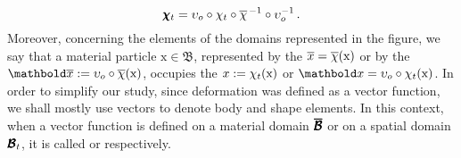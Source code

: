 \begin{equation}
\pmb{\chi}_t = \upsilon_o\circ\chi_t\circ\overline{\chi}^{\,-1}\circ\upsilon_o^{-1}\,.
\end{equation}
Moreover, concerning the elements of the domains represented in the figure, we say that a material particle $\text{x}\in\mathfrak{B}$, represented by the  $\overline{x}=\overline{\chi}(\text{x})$ or by the  $\vto{\overline{x}}:=\fua{\upsilon_o\circ\overline{\chi}}{\text{x}}$, occupies the  $x:=\chi_t(\text{x})$ or $\vto{x}=\fua{\upsilon_o\circ\chi_t}{\text{x}}$. In order to simplify our study, since deformation was defined as a vector function, we shall mostly use vectors to denote body and shape elements. In this context, when a vector function is defined on a material domain $\pmb{\overline{\mathcal{B}}}$ or on a spatial domain $\pmb{\mathcal{B}}_t$, it is called  or  respectively. 

